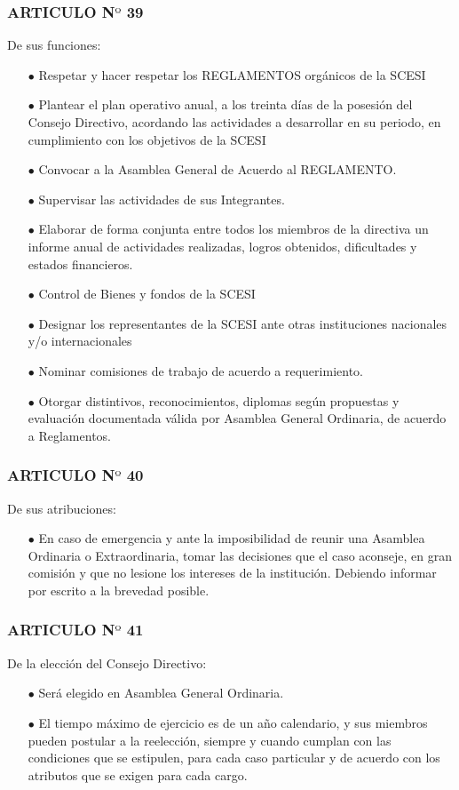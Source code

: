 \documentclass[letterpaper,11pt]{book}
\begin{document}
\begin{itemize}
\subsubsection*{ARTICULO N$º$ 39}
De sus funciones:
\begin{itemize}
\item[$\bullet$] Respetar y hacer respetar los REGLAMENTOS orgánicos de la SCESI 
\item[$\bullet$] Plantear el plan operativo anual, a los treinta días de la posesión del Consejo Directivo, acordando las actividades a desarrollar en su periodo, en cumplimiento con los objetivos de la SCESI 
\item[$\bullet$] Convocar a la Asamblea General de Acuerdo al REGLAMENTO.  
\item[$\bullet$] Supervisar las actividades de sus Integrantes. 
\item[$\bullet$] Elaborar de forma conjunta entre todos los  miembros de la directiva un informe anual de  actividades  realizadas, logros  obtenidos, dificultades  y estados  financieros. 
\item[$\bullet$] Control de Bienes  y fondos  de  la SCESI 
\item[$\bullet$] Designar  los  representantes  de la SCESI ante otras instituciones  nacionales  y/o internacionales   
\item[$\bullet$]  Nominar comisiones  de trabajo de acuerdo a requerimiento. 
\item[$\bullet$] Otorgar distintivos, reconocimientos, diplomas según  propuestas  y evaluación  documentada válida por  Asamblea  General Ordinaria, de acuerdo a Reglamentos. 
\end{itemize}
\subsubsection*{ARTICULO N$º$ 40}
De sus  atribuciones:
 \begin{itemize}
\item[$\bullet$] En caso de emergencia y ante la imposibilidad de reunir una Asamblea Ordinaria o Extraordinaria, tomar las decisiones que  el caso aconseje, en gran comisión y que no lesione los intereses de la  institución. Debiendo informar por escrito a la  brevedad posible. 
\end{itemize}
\subsubsection*{ARTICULO N$º$ 41}
De la  elección  del Consejo  Directivo:
\begin{itemize}
\item[$\bullet$] Será  elegido en  Asamblea  General  Ordinaria. 
\item[$\bullet$] El  tiempo máximo de ejercicio es de un año calendario, y  sus  miembros  pueden  postular a la  reelección,  siempre y cuando cumplan  con  las  condiciones  que  se estipulen,  para cada  caso particular  y  de  acuerdo con los  atributos que se exigen  para cada cargo.    
\end{itemize}
\end{itemize}
\newpage
\end{document}
